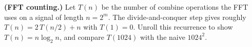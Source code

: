 \begin{exercise}\label{ch32:ex-fft-count}
\textbf{(FFT counting.)} Let $T(n)$ be the number of combine operations the FFT
uses on a signal of length $n=2^m$. The divide-and-conquer step gives roughly
$T(n)=2\,T(n/2)+n$ with $T(1)=0$. Unroll this recurrence to show $T(n)=n\log_2 n$,
and compare $T(1024)$ with the naive $1024^2$.
\end{exercise}
